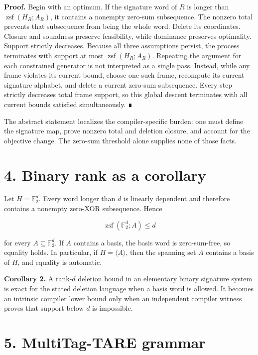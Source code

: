 \documentclass[
  11pt,
]{article}
\begin{document}
\textbf{Proof.} Begin with an optimum. If the signature word of \(R\) is
longer than \(\operatorname{zsf}(H_R; A_R)\), it contains a nonempty
zero-sum subsequence. The nonzero total prevents that subsequence from
being the whole word. Delete its coordinates. Closure and soundness
preserve feasibility, while dominance preserves optimality. Support
strictly decreases. Because all three assumptions persist, the process
terminates with support at most \(\operatorname{zsf}(H_R; A_R)\).
Repeating the argument for each constrained generator is not interpreted
as a single pass. Instead, while any frame violates its current bound,
choose one such frame, recompute its current signature alphabet, and
delete a current zero-sum subsequence. Every step strictly decreases
total frame support, so this global descent terminates with all current
bounds satisfied simultaneously. ∎

The abstract statement localizes the compiler-specific burden: one must
define the signature map, prove nonzero total and deletion closure, and
account for the objective change. The zero-sum threshold alone supplies
none of those facts.

\hypertarget{binary-rank-as-a-corollary}{%
\section{4. Binary rank as a
corollary}\label{binary-rank-as-a-corollary}}

Let \(H=\mathbb F_2^d\). Every word longer than \(d\) is linearly
dependent and therefore contains a nonempty zero-XOR subsequence. Hence

\[
\operatorname{zsf}(\mathbb F_2^d; A)\le d
\]

for every \(A\subseteq\mathbb F_2^d\). If \(A\) contains a basis, the
basis word is zero-sum-free, so equality holds. In particular, if
\(H=\langle A\rangle\), then the spanning set \(A\) contains a basis of
\(H\), and equality is automatic.

\textbf{Corollary 2.} A rank-\(d\) deletion bound in an elementary
binary signature system is exact for the stated deletion language when a
basis word is allowed. It becomes an intrinsic compiler lower bound only
when an independent compiler witness proves that support below \(d\) is
impossible.

\hypertarget{multitag-tare-grammar}{%
\section{5. MultiTag-TARE grammar}\label{multitag-tare-grammar}}
\end{document}
